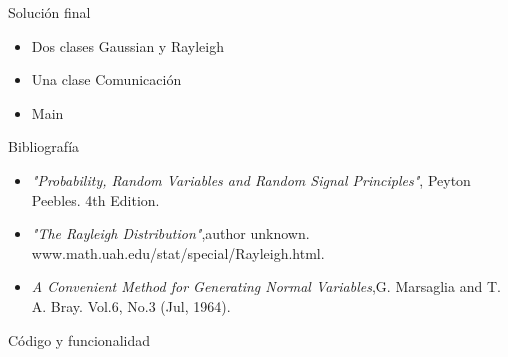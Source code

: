 \documentclass[pdf]{beamer}
\begin{document}
\begin{frame}{Solución final}

\begin{itemize}
\item Dos clases Gaussian y Rayleigh
\item Una clase Comunicación
\item Main
\end{itemize}

\end{frame}

\begin{frame}{Bibliografía}
\begin{itemize}
\item \textit{"Probability, Random Variables and Random Signal Principles"}, Peyton Peebles. 4th Edition.
\item \textit{"The Rayleigh Distribution"},author unknown. www.math.uah.edu/stat/special/Rayleigh.html.
\item \textit{A Convenient Method for Generating Normal Variables},G. Marsaglia and T. A. Bray. Vol.6, No.3 (Jul, 1964).

\end{itemize}
\end{frame}
\begin{frame}{Código y funcionalidad}

\end{frame}
\end{document}
